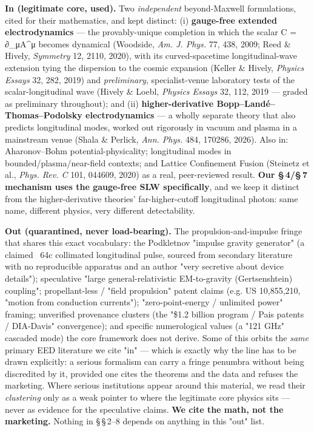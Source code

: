 \documentclass[11pt]{article}
\begin{document}
\textbf{In (legitimate core, used).} Two \emph{independent} beyond-Maxwell formulations, cited for their mathematics, and kept distinct: (i) \textbf{gauge-free extended electrodynamics} --- the provably-unique completion in which the scalar C = ∂\_μA\textasciicircum{}μ becomes dynamical (Woodside, \emph{Am. J. Phys.} 77, 438, 2009; Reed \& Hively, \emph{Symmetry} 12, 2110, 2020), with its curved-spacetime longitudinal-wave extension tying the dispersion to the cosmic expansion (Keller \& Hively, \emph{Physics Essays} 32, 282, 2019) and \emph{preliminary}, specialist-venue laboratory tests of the scalar-longitudinal wave (Hively \& Loebl, \emph{Physics Essays} 32, 112, 2019 --- graded as preliminary throughout); and (ii) \textbf{higher-derivative Bopp--Landé--Thomas--Podolsky electrodynamics} --- a wholly separate theory that also predicts longitudinal modes, worked out rigorously in vacuum and plasma in a mainstream venue (Shala \& Perlick, \emph{Ann. Phys.} 484, 170286, 2026). Also in: Aharonov--Bohm potential-physicality; longitudinal modes in bounded/plasma/near-field contexts; and Lattice Confinement Fusion (Steinetz et al., \emph{Phys. Rev. C} 101, 044609, 2020) as a real, peer-reviewed result. \textbf{Our \S\,4/\S\,7 mechanism uses the gauge-free SLW specifically}, and we keep it distinct from the higher-derivative theories' far-higher-cutoff longitudinal photon: same name, different physics, very different detectability.

\textbf{Out (quarantined, never load-bearing).} The propulsion-and-impulse fringe that shares this exact vocabulary: the Podkletnov "impulse gravity generator" (a claimed ~64c collimated longitudinal pulse, sourced from secondary literature with no reproducible apparatus and an author "very secretive about device details"); speculative "large general-relativistic EM-to-gravity (Gertsenshtein) coupling"; propellant-less / "field propulsion" patent claims (e.g. US 10,855,210, "motion from conduction currents"); "zero-point-energy / unlimited power" framing; unverified provenance clusters (the "\$1.2 billion program / Pais patents / DIA-Davis" convergence); and specific numerological values (a "121 GHz" cascaded mode) the core framework does not derive. Some of this orbits the \emph{same} primary EED literature we cite "in" --- which is exactly why the line has to be drawn explicitly: a serious formalism can carry a fringe penumbra without being discredited by it, provided one cites the theorems and the data and refuses the marketing. Where serious institutions appear around this material, we read their \emph{clustering} only as a weak pointer to where the legitimate core physics sits --- never as evidence for the speculative claims. \textbf{We cite the math, not the marketing.} Nothing in \S\,\S\,2--8 depends on anything in this "out" list.
\end{document}
